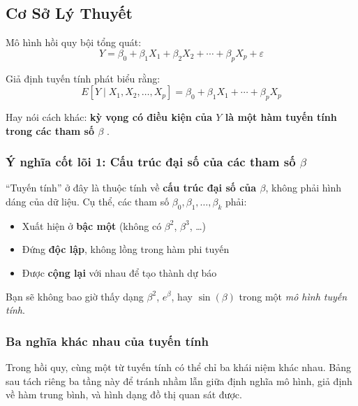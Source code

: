 \subsection{Cơ Sở Lý Thuyết}

Mô hình hồi quy bội tổng quát:
\[
  Y = \beta_0 + \beta_1 X_1 + \beta_2 X_2 + \cdots + \beta_p X_p + \varepsilon
\]

Giả định tuyến tính phát biểu rằng:
\[
  E[Y \mid X_1, X_2, \ldots, X_p] = \beta_0 + \beta_1 X_1 + \cdots + \beta_p X_p
\]

Hay nói cách khác: \textbf{kỳ vọng có điều kiện của $Y$ là một hàm tuyến tính trong các tham số $\beta$}
\cite[Sec.~7.3.1, p.~141]{rencher2008linear}.

\subsubsection{Ý nghĩa cốt lõi 1: Cấu trúc đại số của các tham số \texorpdfstring{$\beta$}{beta}}

``Tuyến tính'' ở đây là thuộc tính về \textbf{cấu trúc đại số của $\beta$}, không phải hình dáng của dữ liệu. Cụ thể, các tham số $\beta_0, \beta_1, \ldots, \beta_k$ phải:
\begin{itemize}
  \item Xuất hiện ở \textbf{bậc một} (không có $\beta^2$, $\beta^3$, \ldots)
  \item Đứng \textbf{độc lập}, không lồng trong hàm phi tuyến
  \item Được \textbf{cộng lại} với nhau để tạo thành dự báo
\end{itemize}

Bạn sẽ không bao giờ thấy dạng $\beta^2$, $e^{\beta}$, hay $\sin(\beta)$ trong một \textit{mô hình tuyến tính}.


\subsubsection{Ba nghĩa khác nhau của tuyến tính}

Trong hồi quy, cùng một từ tuyến tính có thể chỉ ba khái niệm khác nhau. Bảng sau tách riêng ba tầng này để tránh nhầm lẫn giữa định nghĩa mô hình, giả định về hàm trung bình, và hình dạng đồ thị quan sát được.

